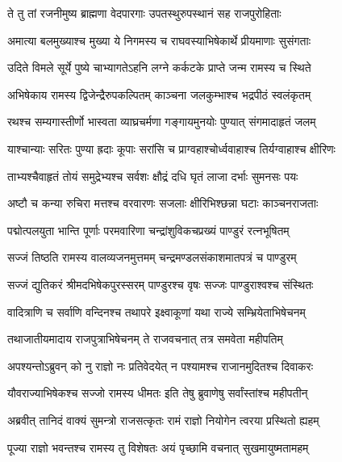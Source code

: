
\twolineshloka
{ते तु तां रजनीमुष्य ब्राह्मणा वेदपारगाः}
{उपतस्थुरुपस्थानं सह राजपुरोहिताः} %

\twolineshloka
{अमात्या बलमुख्याश्च मुख्या ये निगमस्य च}
{राघवस्याभिषेकार्थे प्रीयमाणाः सुसंगताः} %

\twolineshloka
{उदिते विमले सूर्ये पुष्ये चाभ्यागतेऽहनि}
{लग्ने कर्कटके प्राप्ते जन्म रामस्य च स्थिते} %

\twolineshloka
{अभिषेकाय रामस्य द्विजेन्द्रैरुपकल्पितम्}
{काञ्चना जलकुम्भाश्च भद्रपीठं स्वलंकृतम्} %

\twolineshloka
{रथश्च सम्यगास्तीर्णो भास्वता व्याघ्रचर्मणा}
{गङ्गायमुनयोः पुण्यात् संगमादाहृतं जलम्} %

\twolineshloka
{याश्चान्याः सरितः पुण्या ह्रदाः कूपाः सरांसि च}
{प्राग्वहाश्चोर्ध्ववाहाश्च तिर्यग्वाहाश्च क्षीरिणः} %

\twolineshloka
{ताभ्यश्चैवाहृतं तोयं समुद्रेभ्यश्च सर्वशः}
{क्षौद्रं दधि घृतं लाजा दर्भाः सुमनसः पयः} %

\twolineshloka
{अष्टौ च कन्या रुचिरा मत्तश्च वरवारणः}
{सजलाः क्षीरिभिश्छन्ना घटाः काञ्चनराजताः} %

\twolineshloka
{पद्मोत्पलयुता भान्ति पूर्णाः परमवारिणा}
{चन्द्रांशुविकचप्रख्यं पाण्डुरं रत्नभूषितम्} %

\twolineshloka
{सज्जं तिष्ठति रामस्य वालव्यजनमुत्तमम्}
{चन्द्रमण्डलसंकाशमातपत्रं च पाण्डुरम्} %

\twolineshloka
{सज्जं द्युतिकरं श्रीमदभिषेकपुरस्सरम्}
{पाण्डुरश्च वृषः सज्जः पाण्डुराश्वश्च संस्थितः} %

\twolineshloka
{वादित्राणि च सर्वाणि वन्दिनश्च तथापरे}
{इक्ष्वाकूणां यथा राज्ये सम्भ्रियेताभिषेचनम्} %

\twolineshloka
{तथाजातीयमादाय राजपुत्राभिषेचनम्}
{ते राजवचनात् तत्र समवेता महीपतिम्} %

\twolineshloka
{अपश्यन्तोऽब्रुवन् को नु राज्ञो नः प्रतिवेदयेत्}
{न पश्यामश्च राजानमुदितश्च दिवाकरः} %

\twolineshloka
{यौवराज्याभिषेकश्च सज्जो रामस्य धीमतः}
{इति तेषु ब्रुवाणेषु सर्वांस्तांश्च महीपतीन्} %

\twolineshloka
{अब्रवीत् तानिदं वाक्यं सुमन्त्रो राजसत्कृतः}
{रामं राज्ञो नियोगेन त्वरया प्रस्थितो ह्यहम्} %

\twolineshloka
{पूज्या राज्ञो भवन्तश्च रामस्य तु विशेषतः}
{अयं पृच्छामि वचनात् सुखमायुष्मतामहम्} %

